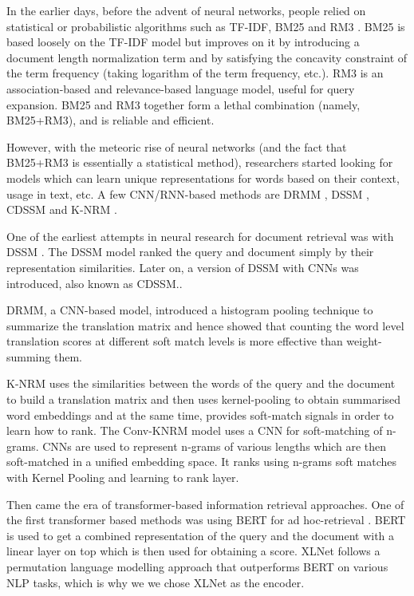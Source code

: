 \documentclass[10pt,twocolumn]{article}
\begin{document}
In the earlier days, before the advent of neural networks, people relied on statistical or probabilistic algorithms such as TF-IDF, BM25 \cite{bm25} and RM3 \cite{rm3}. BM25 is based loosely on the TF-IDF \cite{tf_idf} model but improves on it by introducing a document length normalization term and by satisfying the concavity constraint of the term frequency (taking logarithm of the term frequency, etc.). RM3 is an association-based and relevance-based language model, useful for query expansion. BM25 and RM3 together form a lethal combination (namely, BM25+RM3), and is reliable and efficient.

However, with the meteoric rise of neural networks (and the fact that BM25+RM3 is essentially a statistical method), researchers started looking for models which can learn unique representations for words based on their context, usage in text, etc. A few CNN/RNN-based methods are DRMM \cite{DRMM}, DSSM \cite{DSSM}, CDSSM \cite{CDSSM} and K-NRM \cite{KNRM}. 

One of the earliest attempts in neural research for document retrieval was with DSSM \cite{DSSM}. The DSSM model ranked the query and document simply by their representation similarities. Later on, a version of DSSM with CNNs was introduced, also known as CDSSM.\cite{CDSSM}.

DRMM, a CNN-based model, introduced a histogram pooling technique to summarize the translation matrix and hence showed that counting the word level translation scores at different soft match levels is more effective than weight-summing them.

K-NRM \cite{KNRM} uses the similarities between the words of the query and the document to build a translation matrix and then uses kernel-pooling to obtain summarised word embeddings and at the same time, provides soft-match signals in order to learn how to rank. The Conv-KNRM \cite{CONV_KNRM} model uses a CNN for soft-matching of n-grams. CNNs are used to represent n-grams of various lengths which are then soft-matched in a unified embedding space. It ranks using n-grams soft matches with Kernel Pooling and learning to rank layer.

Then came the era of transformer-based information retrieval approaches. One of the first transformer based methods was using BERT for ad hoc-retrieval \cite{BERTforIR}. BERT is used to get a combined representation of the query and the document with a linear layer on top which is then used for obtaining a score. XLNet \cite{XLNet} follows a permutation language modelling approach that outperforms BERT on various NLP tasks, which is why we we chose XLNet as the encoder.
\end{document}
